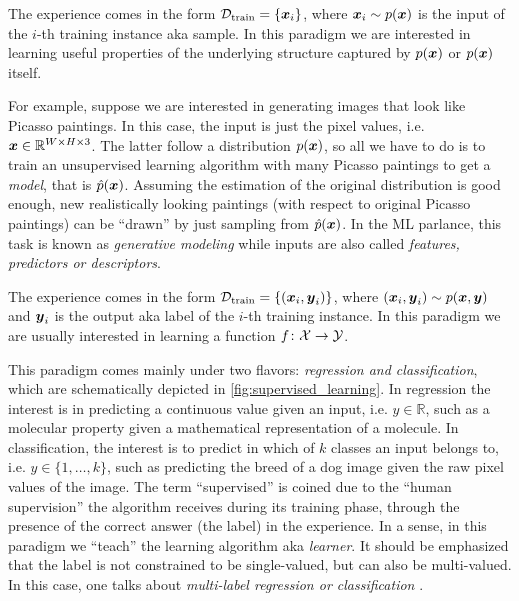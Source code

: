\begin{definition}[name=Unsupervised learning]
	The experience comes in the form $\mathcal{D}_\text{train} = \{\boldsymbol{x}_i\}$, where $\boldsymbol{x}_i \sim
	p(\boldsymbol{x})$ is the input of the $i$-th training
	instance aka sample. In this
	paradigm we are interested in learning useful properties of the underlying
	structure captured by $p(\boldsymbol{x})$ or $p(\boldsymbol{x})$ itself.
\end{definition}

For example, suppose we are interested in generating images that look like
Picasso paintings. In this case, the input is just the pixel values, i.e.  $\boldsymbol{x}
\in \mathbb{R}^{W \times H \times 3}$. The latter follow a distribution
$p(\boldsymbol{x})$, so all we have to do is to train an unsupervised learning algorithm
with many Picasso paintings to get a \emph{model}, that is $\hat{p}(\boldsymbol{x})$.
Assuming the estimation of the original distribution is good enough, new
realistically looking paintings (with respect to original Picasso paintings) can
be ``drawn'' by just sampling from $\hat{p}(\boldsymbol{x})$. In the ML parlance, this
task is known as \emph{generative modeling} while
inputs are also called \emph{features, predictors or
descriptors}.

\begin{definition}[name=Supervised learning]
	The experience comes in the form $\mathcal{D}_\text{train} = \{(\boldsymbol{x}_i, \boldsymbol{y}_i)\}$, where
	$(\boldsymbol{x}_i, \boldsymbol{y}_i) \sim p(\boldsymbol{x}, \boldsymbol{y})$ and $\boldsymbol{y}_i$ is the
	output aka label of the $i$-th training instance.
	In this paradigm we are usually interested in learning a function $f \colon
	\mathcal{X} \to \mathcal{Y}$.
\end{definition}

This paradigm comes mainly under two flavors: \emph{regression
and classification}, which are schematically depicted in
\Figure{} \ref{fig:supervised_learning}. In regression the interest is in
predicting a continuous value given an input, i.e.  $y \in \mathbb{R}$, such as
a molecular property given a mathematical representation of a molecule. In
classification, the interest is to predict in which of $k$ classes an input
belongs to, i.e. $y \in \{1, \ldots, k\}$, such as predicting the breed of a dog
image given the raw pixel values of the image. The term ``supervised'' is coined
due to the ``human supervision'' the algorithm receives during its training
phase, through the presence of the correct answer (the
label) in the experience.  In a sense, in this paradigm we ``teach'' the
learning algorithm aka \emph{learner}. It should be emphasized that the label is
not constrained to be single-valued, but can also be multi-valued. In this case,
one talks about \emph{multi-label regression or
classification} \parencite{Read_2009}.

